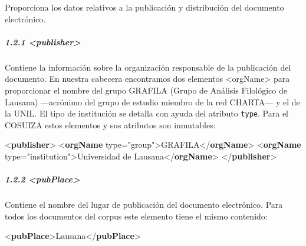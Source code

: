 \documentclass[
]{book}
\newenvironment{Shaded}{\begin{snugshade}}{\end{snugshade}}
\newcommand{\KeywordTok}[1]{\textcolor[rgb]{0.13,0.29,0.53}{\textbf{#1}}}
\newcommand{\NormalTok}[1]{#1}
\newcommand{\OtherTok}[1]{\textcolor[rgb]{0.56,0.35,0.01}{#1}}
\newcommand{\StringTok}[1]{\textcolor[rgb]{0.31,0.60,0.02}{#1}}
\begin{document}
Proporciona los datos relativos a la publicación y distribución del documento electrónico.

\hypertarget{publisher}{%
\subparagraph*{\texorpdfstring{1.2.1 { \textless publisher\textgreater{} }}{1.2.1  \textless publisher\textgreater{} }}\label{publisher}}

Contiene la información sobre la organización responsable de la publicación del documento. En nuestra cabecera encontramos dos elementos { \textless orgName\textgreater{} } para proporcionar el nombre del grupo GRAFILA (Grupo de Análisis Filológico de Lausana) ---acrónimo del grupo de estudio miembro de la red CHARTA--- y el de la UNIL. El tipo de institución se detalla con ayuda del atributo \texttt{type}. Para el COSUIZA estos elementos y sus atributos son inmutables:

\begin{Shaded}
\begin{Highlighting}[]
\NormalTok{\textless{}}\KeywordTok{publisher}\NormalTok{\textgreater{}}
\NormalTok{    \textless{}}\KeywordTok{orgName}\OtherTok{ type=}\StringTok{"group"}\NormalTok{\textgreater{}GRAFILA\textless{}/}\KeywordTok{orgName}\NormalTok{\textgreater{} }
\NormalTok{    \textless{}}\KeywordTok{orgName}\OtherTok{ type=}\StringTok{"institution"}\NormalTok{\textgreater{}Universidad de Lausana\textless{}/}\KeywordTok{orgName}\NormalTok{\textgreater{}}
\NormalTok{\textless{}/}\KeywordTok{publisher}\NormalTok{\textgreater{}}
\end{Highlighting}
\end{Shaded}

\hypertarget{pubplace}{%
\subparagraph*{\texorpdfstring{1.2.2 { \textless pubPlace\textgreater{} }}{1.2.2  \textless pubPlace\textgreater{} }}\label{pubplace}}

Contiene el nombre del lugar de publicación del documento electrónico. Para todos los documentos del corpus este elemento tiene el mismo contenido:

\begin{Shaded}
\begin{Highlighting}[]
\NormalTok{\textless{}}\KeywordTok{pubPlace}\NormalTok{\textgreater{}Lausana\textless{}/}\KeywordTok{pubPlace}\NormalTok{\textgreater{} }
\end{Highlighting}
\end{Shaded}
\end{document}
